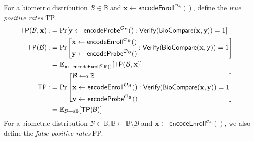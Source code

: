 For a biometric distribution $\mathcal{B} \in \mathbb{B}$ and $\mathbf{x} \gets \textsf{encodeEnroll}^{\mathcal{O}_\mathcal{B}}()$, define the \emph{true positive rates} \textsf{TP}.
\begin{align*}
	\textsf{TP}(\mathcal{B}, \mathbf{x}) 
	:&= \Pr[ \mathbf{y} \gets \textsf{encodeProbe}^{\mathcal{O}_\mathcal{B}}(): \textsf{Verify}(\textsf{BioCompare}(\mathbf{x}, \mathbf{y} )) = 1 ] \\
	\textsf{TP}(\mathcal{B}) 
	:&= \Pr \left[ 
		\begin{aligned}	
			& \mathbf{x} \gets \textsf{encodeEnroll}^{\mathcal{O}_\mathcal{B}}() \\
			& \mathbf{y} \gets \textsf{encodeProbe}^{\mathcal{O}_\mathcal{B}}()
		\end{aligned}
		: \textsf{Verify}(\textsf{BioCompare}(\mathbf{x}, \mathbf{y})) = 1 \right] \\
	&= \mathbb{E}_{ \mathbf{x} \gets \textsf{encodeEnroll}^{\mathcal{O}_\mathcal{B}}() }[\textsf{TP}(\mathcal{B}, \mathbf{x})] \\
	\textsf{TP} 
	:&= \Pr \left[
		\begin{aligned}
			& \mathcal{B} \getsdollar \mathbb{B} \\
			& \mathbf{x} \gets \textsf{encodeEnroll}^{\mathcal{O}_\mathcal{B} }() \\
			& \mathbf{y} \gets \textsf{encodeProbe}^{\mathcal{O}_\mathcal{B} }()
		\end{aligned}
		: \textsf{Verify}(\textsf{BioCompare}(\mathbf{x}, \mathbf{y} )) = 1 \right] \\
	&= \mathbb{E}_{\mathcal{B} \getsdollar \mathbb{B}}[\textsf{TP}(\mathcal{B})] 
\end{align*}
For a biometric distribution $\mathcal{B} \in \mathbb{B}, \mathbb{B} \gets \mathbb{B} \setminus \mathcal{B}$ and $\mathbf{x} \gets \textsf{encodeEnroll}^{\mathcal{O}_\mathcal{B}}()$, we also define the \emph{false positive rates} \textsf{FP}.
